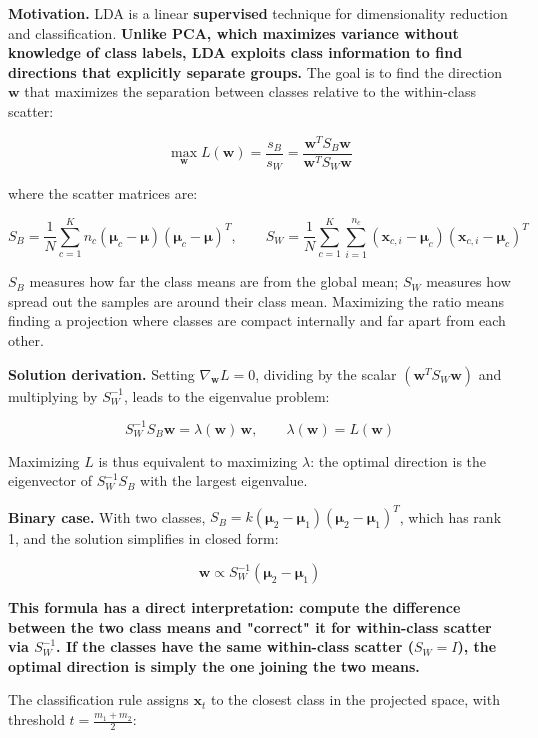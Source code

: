 \textbf{Motivation.} LDA is a linear \textbf{supervised} technique for dimensionality reduction and classification. \textbf{Unlike PCA, which maximizes variance without knowledge of class labels, LDA exploits class information to find directions that explicitly separate groups.} The goal is to find the direction $\mathbf{w}$ that maximizes the separation between classes relative to the within-class scatter:

$$\max_{\mathbf{w}} L(\mathbf{w}) = \frac{s_B}{s_W} = \frac{\mathbf{w}^T S_B \mathbf{w}}{\mathbf{w}^T S_W \mathbf{w}}$$

where the scatter matrices are:

$$S_B = \frac{1}{N}\sum_{c=1}^{K} n_c (\boldsymbol{\mu}_c - \boldsymbol{\mu})(\boldsymbol{\mu}_c - \boldsymbol{\mu})^T, \qquad S_W = \frac{1}{N}\sum_{c=1}^{K}\sum_{i=1}^{n_c} (\mathbf{x}_{c,i} - \boldsymbol{\mu}_c)(\mathbf{x}_{c,i} - \boldsymbol{\mu}_c)^T$$

$S_B$ measures how far the class means are from the global mean; $S_W$ measures how spread out the samples are around their class mean. Maximizing the ratio means finding a projection where classes are compact internally and far apart from each other.

\textbf{Solution derivation.} Setting $\nabla_\mathbf{w} L = 0$, dividing by the scalar $(\mathbf{w}^T S_W \mathbf{w})$ and multiplying by $S_W^{-1}$, leads to the eigenvalue problem:

$$S_W^{-1} S_B \mathbf{w} = \lambda(\mathbf{w})\,\mathbf{w}, \qquad \lambda(\mathbf{w}) = L(\mathbf{w})$$

Maximizing $L$ is thus equivalent to maximizing $\lambda$: the optimal direction is the eigenvector of $S_W^{-1}S_B$ with the largest eigenvalue.

\textbf{Binary case.} With two classes, $S_B = k(\boldsymbol{\mu}_2 - \boldsymbol{\mu}_1)(\boldsymbol{\mu}_2-\boldsymbol{\mu}_1)^T$, which has rank 1, and the solution simplifies in closed form:

$$\mathbf{w} \propto S_W^{-1}(\boldsymbol{\mu}_2 - \boldsymbol{\mu}_1)$$

\textbf{This formula has a direct interpretation: compute the difference between the two class means and "correct" it for within-class scatter via $S_W^{-1}$. If the classes have the same within-class scatter ($S_W = I$), the optimal direction is simply the one joining the two means.}

The classification rule assigns $\mathbf{x}_t$ to the closest class in the projected space, with threshold $t = \frac{m_1+m_2}{2}$:


